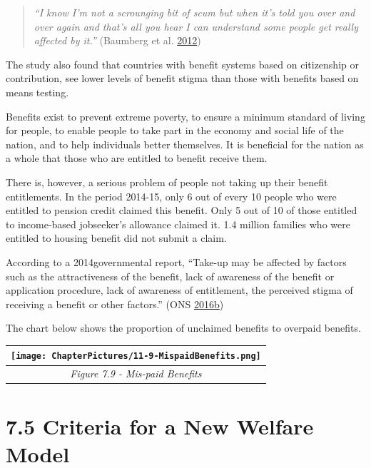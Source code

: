 \documentclass[]{tufte-handout}
\begin{document}
\begin{quote}
\emph{``I know I'm not a scrounging bit of scum but when it's told you
over and over again and that's all you hear I can understand some people
get really affected by it.''} (Baumberg et al.
\protect\hyperlink{ref-Baumberg2012}{2012})
\end{quote}

The study also found that countries with benefit systems based on
citizenship or contribution, see lower levels of benefit stigma than
those with benefits based on means testing.

Benefits exist to prevent extreme poverty, to ensure a minimum standard
of living for people, to enable people to take part in the economy and
social life of the nation, and to help individuals better themselves. It
is beneficial for the nation as a whole that those who are entitled to
benefit receive them.

There is, however, a serious problem of people not taking up their
benefit entitlements. In the period 2014-15, only 6 out of every 10
people who were entitled to pension credit claimed this benefit. Only 5
out of 10 of those entitled to income-based jobseeker's allowance
claimed it. 1.4 million families who were entitled to housing benefit
did not submit a claim.

According to a 2014governmental report, ``Take-up may be affected by
factors such as the attractiveness of the benefit, lack of awareness of
the benefit or application procedure, lack of awareness of entitlement,
the perceived stigma of receiving a benefit or other factors.'' (ONS
\protect\hyperlink{ref-ONS2016c}{2016}\protect\hyperlink{ref-ONS2016c}{b})

The chart below shows the proportion of unclaimed benefits to overpaid
benefits.

\begin{longtable}[]{@{}c@{}}
\toprule
\texttt{[image: ChapterPictures/11-9-MispaidBenefits.png]}\tabularnewline
\midrule
\endhead
\emph{Figure 7.9 - Mis-paid Benefits }\tabularnewline
\bottomrule
\end{longtable}

\hypertarget{criteria-for-a-new-welfare-model}{%
\section{7.5 Criteria for a New Welfare
Model}\label{criteria-for-a-new-welfare-model}}
\end{document}
